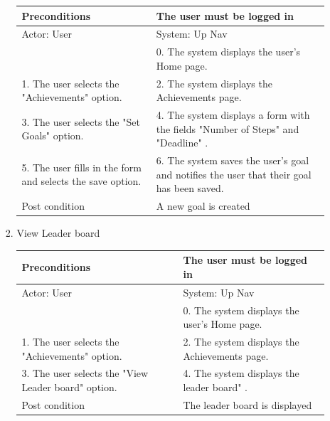 \documentclass{article}
\begin{document}
\begin{enumerate}
\begin{center}
\begin{enumerate}
\begin{enumerate}
	\begin{table}[H]
	\centering
		\begin{tabular}{ | p{15em} | p{15em}| }
		\hline
		Preconditions                                                       										& The user must be logged in \\ 				
		\hline
		Actor: User                                                       											& System: Up Nav \\ 			
		\hline
                                                                  													& 0. The system displays the user's Home page. \\                                                           
		 \hline
		1. The user selects the "Achievements" option.										& 2. The system displays the Achievements  page. \\
		 \hline
		3. The user selects the "Set Goals" option. 											& 4.  The system displays a form with the fields "Number of Steps" and "Deadline" . \\
		\hline
		5. The user fills in the form and selects the save option.									& 6. The system saves the user's goal and notifies the user that their goal has been saved. \\
		\hline
		Post condition                                                     										& A new goal is created \\ 			
		\hline
		\end{tabular}
	\end{table}

	\item{View Leader board}

	\begin{table}[H]
	\centering
		\begin{tabular}{ | p{15em} | p{15em}| }
		\hline
		Preconditions                                                       										& The user must be logged in \\ 				
		\hline
		Actor: User                                                       											& System: Up Nav \\ 			
		\hline
                                                                  													& 0. The system displays the user's Home page. \\                                                           
		 \hline
		1. The user selects the "Achievements" option.										& 2. The system displays the Achievements  page. \\
		 \hline
		3. The user selects the "View Leader board" option. 										& 4.  The system displays the leader board" . \\
		\hline
		Post condition                                                     										& The leader board is displayed \\ 			
		\hline
		\end{tabular}
	\end{table}


\end{enumerate}
\end{enumerate}
\end{center}
\end{enumerate}
\end{document}
